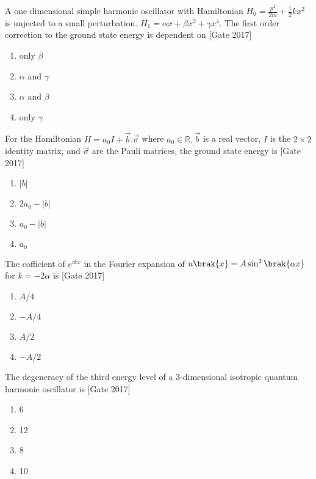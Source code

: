 	\item A one dimensional simple harmonic oscillator with Hamiltonian $H_0 = \frac{p^2}{2m} + \frac{1}{2}kx^2$ is unjected to a small perturbation. $H_1 = \alpha x + \beta x^2 + \gamma x^4$. The first order correction to the ground state energy is dependent on \hfill{[Gate 2017]}
	\begin{multicols}{4}
	\begin{enumerate}
		\item only $\beta$
		\item $\alpha$ and $\gamma$
		\item $\alpha$ and $\beta$
		\item only $\gamma$
	\end{enumerate}
\end{multicols}
	\item For the Hamiltonian $H = a_0 I + \overrightarrow b.\overrightarrow \sigma$ where $a_0 \in \mathbb{R}, \overrightarrow b$ is a real vector, $I$ is the $2 \times 2$ identity matrix, and $\overrightarrow \sigma$ are the Pauli matrices, the ground state energy is \hfill{[Gate 2017]}
	\begin{multicols}{4}
	\begin{enumerate}
		\item $|b|$
		\item $2a_0 - |b|$
		\item $a_0 - |b|$
		\item $a_0$
	\end{enumerate}
\end{multicols}
	\item The cofficient of $e^{ikx}$ in the Fourier expansion of $u\brak{x} = A \sin^{2}\brak{\alpha x}$ for $k = -2\alpha$ is \hfill{[Gate 2017]}
	\begin{multicols}{4}
	\begin{enumerate}
		\item $A/4$
		\item $-A/4$
		\item $A/2$
		\item $-A/2$
	\end{enumerate}
\end{multicols}
	\item The degeneracy of the third energy level of a 3-dimensional isotropic quantum harmonic oscillator is \hfill{[Gate 2017]}
	\begin{multicols}{4}
	\begin{enumerate}
		\item 6
		\item 12
		\item 8
		\item 10
	\end{enumerate}
\end{multicols}
